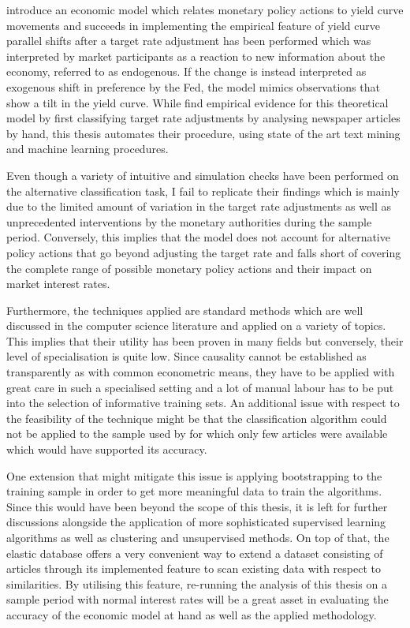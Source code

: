 
\textcite{Ellingsen.2001} introduce an economic model which relates monetary policy actions to yield curve movements and succeeds in implementing the empirical feature of yield curve parallel shifts after a target rate adjustment has been performed which was interpreted by market participants as a reaction to new information about the economy, referred to as endogenous. If the change is instead interpreted as exogenous shift in preference by the Fed, the model mimics observations that show a tilt in the yield curve. While \textcite{Ellingsen.2003} find empirical evidence for this theoretical model by first classifying target rate adjustments by analysing newspaper articles by hand, this thesis automates their procedure, using state of the art text mining and machine learning procedures. 

Even though a variety of intuitive and simulation checks have been performed on the alternative classification task, I fail to replicate their findings which is mainly due to the limited amount of variation in the target rate adjustments as well as unprecedented interventions by the monetary authorities during the sample period. Conversely, this implies that the model does not account for alternative policy actions that go beyond adjusting the target rate and falls short of covering the complete range of possible monetary policy actions and their impact on market interest rates.

Furthermore, the techniques applied are standard methods which are well discussed in the computer science literature and applied on a variety of topics. This implies that their utility has been proven in many fields but conversely, their level of specialisation is quite low. Since causality cannot be established as transparently as with common econometric means, they have to be applied with great care in such a specialised setting and a lot of manual labour has to be put into the selection of informative training sets. An additional issue with respect to the feasibility of the technique might be that the classification algorithm could not be applied to the sample used by \textcite{Ellingsen.2003} for which only few articles were available which would have supported its accuracy.

One extension that might mitigate this issue is applying bootstrapping to the training sample in order to get more meaningful data to train the algorithms. Since this would have been beyond the scope of this thesis, it is left for further discussions alongside the application of more sophisticated supervised learning algorithms as well as clustering and unsupervised methods. On top of that, the elastic database \parencite{Elastic.2015} offers a very convenient way to extend a dataset consisting of articles through its implemented feature to scan existing data with respect to similarities. By utilising this feature, re-running the analysis of this thesis on a sample period with normal interest rates will be a great asset in evaluating the accuracy of the economic model at hand as well as the applied methodology.
